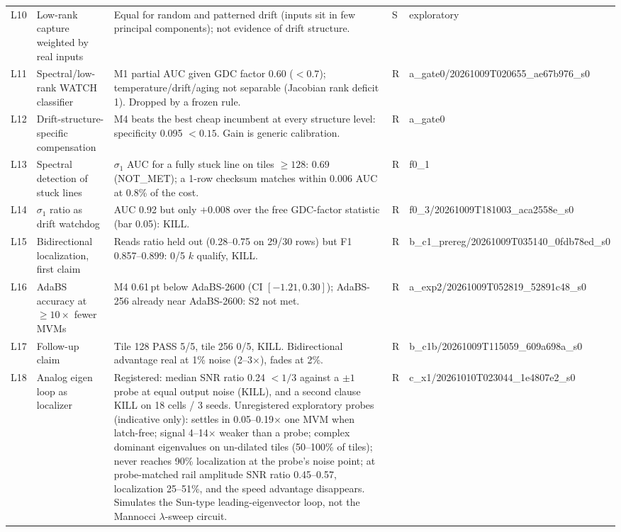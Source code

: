 \documentclass[journal]{IEEEtran}
\newcommand{\mfour}{\textsc{M4}}
\newcommand{\pt}{\,pt}
\begin{document}
\begin{table}[t]
\begin{tabular}{p{0.5cm}p{3.9cm}p{8.8cm}p{0.5cm}p{2.5cm}}
L10 & Low-rank capture weighted by real inputs & Equal for random and patterned drift (inputs sit in few principal components); not evidence of drift structure. & S & exploratory \\
L11 & Spectral/low-rank WATCH classifier & M1 partial AUC given GDC factor 0.60 ($<0.7$); temperature/drift/aging not separable (Jacobian rank deficit 1). Dropped by a frozen rule. & R & a\_gate0/\allowbreak 20261009T020655\_ae67b976\_s0 \\
L12 & Drift-structure-specific compensation & \mfour{} beats the best cheap incumbent at every structure level: specificity 0.095 $<0.15$. Gain is generic calibration. & R & a\_gate0 \\
L13 & Spectral detection of stuck lines & $\sigma_1$ AUC for a fully stuck line on tiles $\ge128$: 0.69 (NOT\_MET); a 1-row checksum matches within 0.006 AUC at 0.8\% of the cost. & R & f0\_1 \\
L14 & $\sigma_1$ ratio as drift watchdog & AUC 0.92 but only $+0.008$ over the free GDC-factor statistic (bar 0.05): KILL. & R & f0\_3/\allowbreak 20261009T181003\_aca2558e\_s0 \\
L15 & Bidirectional localization, first claim & Reads ratio held out (0.28--0.75 on 29/30 rows) but F1 0.857--0.899: 0/5 $k$ qualify, KILL. & R & b\_c1\_prereg/\allowbreak 20261009T035140\_0fdb78ed\_s0 \\
L16 & AdaBS accuracy at $\ge10\times$ fewer MVMs & \mfour{} 0.61\pt{} below AdaBS-2600 (CI $[-1.21,0.30]$); AdaBS-256 already near AdaBS-2600: S2 not met. & R & a\_exp2/\allowbreak 20261009T052819\_52891c48\_s0 \\
L17 & Follow-up claim & Tile 128 PASS 5/5, tile 256 0/5, KILL. Bidirectional advantage real at 1\% noise (2--3$\times$), fades at 2\%. & R & b\_c1b/\allowbreak 20261009T115059\_609a698a\_s0 \\
L18 & Analog eigen loop as localizer & Registered: median SNR ratio 0.24 $<1/3$ against a $\pm1$ probe at equal output noise (KILL), and a second clause KILL on 18 cells / 3 seeds. Unregistered exploratory probes (indicative only): settles in 0.05--0.19$\times$ one MVM when latch-free; signal 4--14$\times$ weaker than a probe; complex dominant eigenvalues on un-dilated tiles (50--100\% of tiles); never reaches 90\% localization at the probe's noise point; at probe-matched rail amplitude SNR ratio 0.45--0.57, localization 25--51\%, and the speed advantage disappears. Simulates the Sun-type leading-eigenvector loop, not the Mannocci $\lambda$-sweep circuit. & R & c\_x1/\allowbreak 20261010T023044\_1e4807e2\_s0 \\

\end{tabular}
\end{table}
\end{document}

